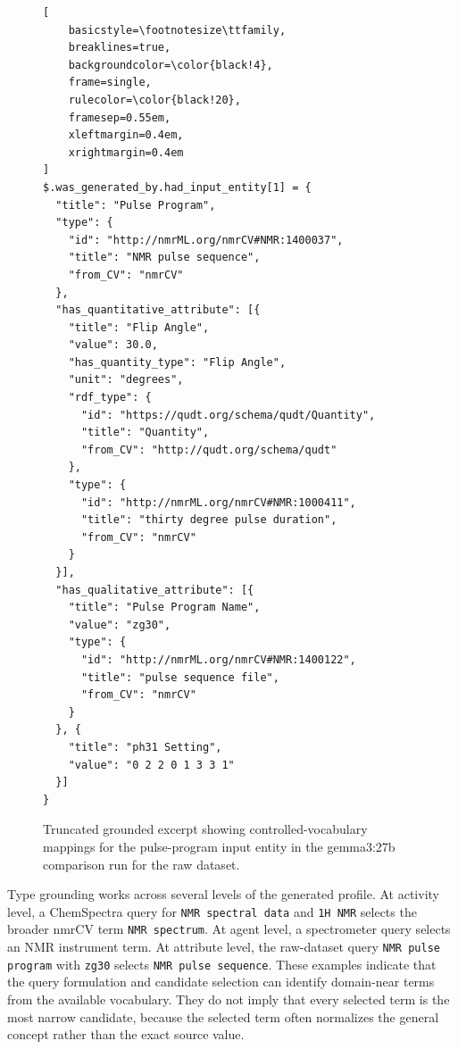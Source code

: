 \begin{figure}[htbp]
\begin{lstlisting}[
    basicstyle=\footnotesize\ttfamily,
    breaklines=true,
    backgroundcolor=\color{black!4},
    frame=single,
    rulecolor=\color{black!20},
    framesep=0.55em,
    xleftmargin=0.4em,
    xrightmargin=0.4em
]
$.was_generated_by.had_input_entity[1] = {
  "title": "Pulse Program",
  "type": {
    "id": "http://nmrML.org/nmrCV#NMR:1400037",
    "title": "NMR pulse sequence",
    "from_CV": "nmrCV"
  },
  "has_quantitative_attribute": [{
    "title": "Flip Angle",
    "value": 30.0,
    "has_quantity_type": "Flip Angle",
    "unit": "degrees",
    "rdf_type": {
      "id": "https://qudt.org/schema/qudt/Quantity",
      "title": "Quantity",
      "from_CV": "http://qudt.org/schema/qudt"
    },
    "type": {
      "id": "http://nmrML.org/nmrCV#NMR:1000411",
      "title": "thirty degree pulse duration",
      "from_CV": "nmrCV"
    }
  }],
  "has_qualitative_attribute": [{
    "title": "Pulse Program Name",
    "value": "zg30",
    "type": {
      "id": "http://nmrML.org/nmrCV#NMR:1400122",
      "title": "pulse sequence file",
      "from_CV": "nmrCV"
    }
  }, {
    "title": "ph31 Setting",
    "value": "0 2 2 0 1 3 3 1"
  }]
}
\end{lstlisting}
    \caption{Truncated grounded excerpt showing controlled-vocabulary mappings for the pulse-program input entity in the gemma3:27b comparison run for the raw dataset.}
    \label{fig:evaluation-pulse-program-grounding-shape}
\end{figure}
\FloatBarrier

Type grounding works across several levels of the generated profile.
At activity level, a ChemSpectra query for \texttt{NMR spectral data} and \texttt{1H NMR} selects the broader \ac{nmrCV} term \texttt{NMR spectrum}.
At agent level, a spectrometer query selects an NMR instrument term.
At attribute level, the raw-dataset query \texttt{NMR pulse program} with \texttt{zg30} selects \texttt{NMR pulse sequence}.
These examples indicate that the query formulation and candidate selection can identify domain-near terms from the available vocabulary.
They do not imply that every selected term is the most narrow candidate, because the selected term often normalizes the general concept rather than the exact source value.

